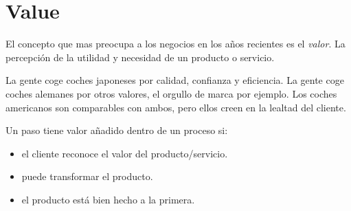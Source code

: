 \documentclass[oneside]{book}
\begin{document}
\section{Value}

El concepto que mas preocupa a los negocios en los años recientes es el \textit{valor}. La percepción de la utilidad y necesidad de un producto o servicio. 

La gente coge coches japoneses por calidad, confianza y eficiencia. La gente coge coches alemanes por otros valores, el orgullo de marca por ejemplo. Los coches americanos son comparables con ambos, pero ellos creen en la lealtad del cliente. 

Un paso tiene valor añadido dentro de un proceso si: \begin{itemize} \item el cliente reconoce el valor del producto/servicio. \item puede transformar el producto. \item el producto está bien hecho a la primera. \end{itemize}
\end{document}
